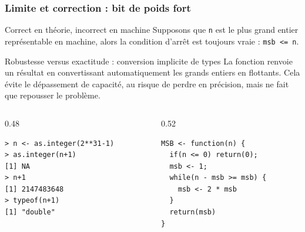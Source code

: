 \documentclass[10pt]{beamer}
\begin{document}
\begin{frame}[fragile]
  \frametitle{Limite et correction : bit de poids fort}

  \begin{alertblock}{Correct en théorie, incorrect en machine}
    Supposons que \texttt{n} est le plus grand entier représentable en machine, alors la condition d'arrêt est toujours vraie :
    \lstinline!msb <= n!.
  \end{alertblock}

  \begin{block}{Robustesse versus exactitude : conversion implicite de types}
    La fonction renvoie un résultat en convertissant automatiquement les grands entiers en flottants.
    Cela évite le dépassement de capacité, au risque de perdre en précision, mais ne fait que repousser le problème.
  \end{block}
  \begin{columns}[t]
    \begin{column}{0.48\textwidth}

      \begin{lstlisting}
> n <- as.integer(2**31-1)
> as.integer(n+1)
[1] NA
> n+1
[1] 2147483648
> typeof(n+1)
[1] "double"
      \end{lstlisting}
    \end{column}
    \begin{column}{0.52\textwidth}
      \begin{lstlisting}[style=editor]
MSB <- function(n) {
  if(n <= 0) return(0);
  msb <- 1;
  while(n - msb >= msb) {
    msb <- 2 * msb
  }
  return(msb)
}
      \end{lstlisting}
    \end{column}

  \end{columns}
\end{frame}
\end{document}
